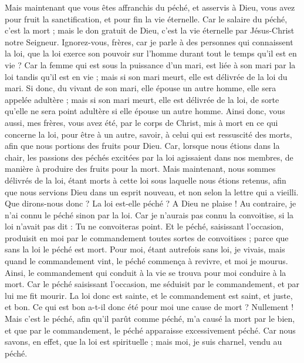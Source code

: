 \begin{multicols}{2}
Mais maintenant que vous êtes affranchis du péché, et asservis à Dieu, vous avez pour fruit la sanctification, et pour fin la vie éternelle.
Car le salaire du péché, c'est la mort ; mais le don gratuit de Dieu, c'est la vie éternelle par Jésus-Christ notre Seigneur.
\VerseOne{}Ignorez-vous, frères, car je parle à des personnes qui connaissent la loi, que la loi exerce son pouvoir sur l'homme durant tout le temps qu'il est en vie ?
Car la femme qui est sous la puissance d'un mari, est liée à son mari par la loi tandis qu'il est en vie ; mais si son mari meurt, elle est délivrée de la loi du mari.
Si donc, du vivant de son mari, elle épouse un autre homme, elle sera appelée adultère ; mais si son mari meurt, elle est délivrée de la loi, de sorte qu'elle ne sera point adultère si elle épouse un autre homme.
Ainsi donc, vous aussi, mes frères, vous avez été, par le corps de Christ, mis à mort en ce qui concerne la loi, pour être à un autre, savoir, à celui qui est ressuscité des morts, afin que nous portions des fruits pour Dieu.
Car, lorsque nous étions dans la chair, les passions des péchés excitées par la loi agissaient dans nos membres, de manière à produire des fruits pour la mort.
Mais maintenant, nous sommes délivrés de la loi, étant morts à cette loi sous laquelle nous étions retenus, afin que nous servions Dieu dans un esprit nouveau, et non selon la lettre qui a vieilli.
Que dirons-nous donc ? La loi est-elle péché ? A Dieu ne plaise ! Au contraire, je n'ai connu le péché sinon par la loi. Car je n'aurais pas connu la convoitise, si la loi n'avait pas dit : Tu ne convoiteras point.
Et le péché, saisissant l'occasion, produisit en moi par le commandement toutes sortes de convoitises ; parce que sans la loi le péché est mort.
Pour moi, étant autrefois sans loi, je vivais, mais quand le commandement vint, le péché commença à revivre, et moi je mourus.
Ainsi, le commandement qui conduit à la vie se trouva pour moi conduire à la mort.
Car le péché saisissant l'occasion, me séduisit par le commandement, et par lui me fit mourir.
La loi donc est sainte, et le commandement est saint, et juste, et bon.
Ce qui est bon a-t-il donc été pour moi une cause de mort ? Nullement ! Mais c'est le péché, afin qu'il parût comme péché, m'a causé la mort par le bien, et que par le commandement, le péché apparaisse excessivement péché.
Car nous savons, en effet, que la loi est spirituelle ; mais moi, je suis charnel, vendu au péché.

\end{multicols}
